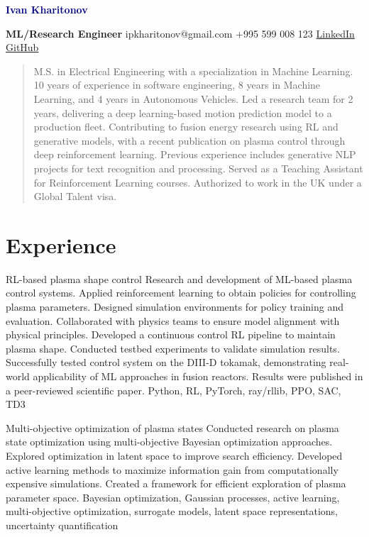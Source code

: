 \documentclass[]{resume}
\begin{document}
\begin{center}
	\textcolor{navy}{\Huge \textbf{Ivan Kharitonov}} \par\vspace{0.2cm}
	\normalsize \textbf{ML/Research Engineer} \hfill
	ipkharitonov@gmail.com \hfill
	+995 599 008 123 \hfill
	\href{https://www.linkedin.com/in/ivan-kharitonov-main/}{LinkedIn} \hfill
	\href{https://github.com/kharitonov-ivan}{GitHub}
\end{center}
\vspace{-0.5em}

\begin{quote}
	\noindent M.S. in Electrical Engineering with a specialization in Machine Learning. 10 years of experience in software engineering, 8 years in Machine Learning, and 4 years in Autonomous Vehicles. Led a research team for 2 years, delivering a deep learning-based motion prediction model to a production fleet. Contributing to fusion energy research using RL and generative models, with a recent publication on plasma control through deep reinforcement learning. Previous experience includes generative NLP projects for text recognition and processing. Served as a Teaching Assistant for Reinforcement Learning courses. Authorized to work in the UK under a Global Talent visa.
\end{quote}

\section*{\sectionformat Experience}
\project
{RL-based plasma shape control}
{Research and development of ML-based plasma control systems. Applied reinforcement learning to obtain policies for controlling plasma parameters. Designed simulation environments for policy training and evaluation. Collaborated with physics teams to ensure model alignment with physical principles. Developed a continuous control RL pipeline to maintain plasma shape. Conducted testbed experiments to validate simulation results.}
{Successfully tested control system on the DIII-D tokamak, demonstrating real-world applicability of ML approaches in fusion reactors. Results were published in a peer-reviewed scientific paper.}
{Python, RL, PyTorch, ray/rllib, PPO, SAC, TD3}

\project
{Multi-objective optimization of plasma states}
{Conducted research on plasma state optimization using multi-objective Bayesian optimization approaches. Explored optimization in latent space to improve search efficiency. Developed active learning methods to maximize information gain from computationally expensive simulations. Created a framework for efficient exploration of plasma parameter space.}
{}
{Bayesian optimization, Gaussian processes, active learning, multi-objective optimization, surrogate models, latent space representations, uncertainty quantification}
\end{document}
